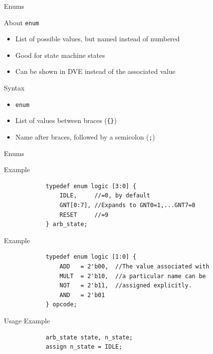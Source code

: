 \documentclass[dvipsnames]{beamer}
\begin{document}
\begin{frame}{Enums}
	\begin{block}{About \texttt{enum}}
		\begin{itemize}
			\item List of possible values, but named instead of numbered
			\item Good for state machine states
			\item Can be shown in DVE instead of the associated value
		\end{itemize}
	\end{block}
	\begin{block}{Syntax}
		\begin{itemize}
			\item \texttt{enum}
			\item List of values between braces (\texttt{\{\}})
			\item Name after braces, followed by a semicolon (\texttt{;})
		\end{itemize}
	\end{block}
\end{frame}

\begin{frame}[fragile]{Enums}
	\vspace*{-12pt}
	\begin{block}{Example}
		\vspace*{-12pt}
		\begin{verbatim}
			typedef enum logic [3:0] {
			    IDLE,     //=0, by default
			    GNT[0:7], //Expands to GNT0=1,...GNT7=8
			    RESET     //=9
			} arb_state;
		\end{verbatim}
	\end{block}
	\begin{block}{Example}
		\vspace*{-12pt}
		\begin{verbatim}
			typedef enum logic [1:0] {
			    ADD   = 2'b00,  //The value associated with
			    MULT  = 2'b10,  //a particular name can be
			    NOT   = 2'b11,  //assigned explicitly.
			    AND   = 2'b01
			} opcode;
		\end{verbatim}
	\end{block}
	\begin{block}{Usage Example}
		\vspace*{-12pt}
		\begin{verbatim}
			arb_state state, n_state;
			assign n_state = IDLE;
		\end{verbatim}
	\end{block}
\end{frame}
\end{document}
